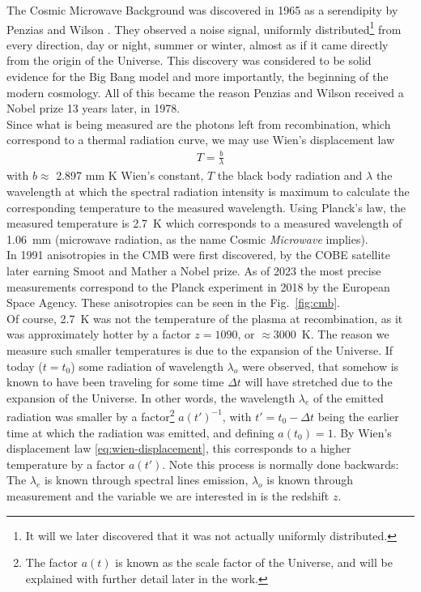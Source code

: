 The Cosmic Microwave Background was discovered in 1965 as a serendipity by Penzias and Wilson \cite{Penzias1965}. They observed a noise signal, uniformly distributed\footnote{It will we later discovered that it was not actually uniformly distributed.} from every direction, day or night, summer or winter, almost as if it came directly from the origin of the Universe.
This discovery was considered to be solid evidence for the Big Bang model and more importantly, the beginning of the modern cosmology. All of this became the reason Penzias and Wilson received a Nobel prize 13 years later, in 1978. \\

Since what is being measured are the photons left from recombination, which correspond to a thermal radiation curve, we may use Wien's displacement law
\begin{align}
	T = \frac{b}{\lambda}
	\label{eq:wien-displacement}
\end{align}
with $b\approx $ 2.897 mm K Wien's constant, $T$ the black body radiation and $\lambda$ the wavelength at which the spectral radiation intensity is maximum to calculate the corresponding temperature to the measured wavelength. Using Planck's law, the measured temperature is \SI{2.7}{K} which corresponds to a measured wavelength of \SI{1.06}{mm} (microwave radiation, as the name Cosmic \textit{Microwave} implies). \\

In 1991 anisotropies in the CMB were first discovered, by the COBE satellite \cite{SmootMather} later earning Smoot and Mather a Nobel prize. As of 2023 the most precise measurements correspond to the Planck experiment in 2018 \cite{Planck2018} by the European Space Agency. These anisotropies can be seen in the Fig.~\ref{fig:cmb}. \\

Of course, \SI{2.7}{K} was not the temperature of the plasma at recombination, as it was approximately hotter by a factor $z=1090$, or $\approx$\SI{3000}{K}. The reason we measure such smaller temperatures is due to the expansion of the Universe.
If today ($t=t_0$) some radiation of wavelength $\lambda_o$ were observed, that somehow is known to have been traveling for some time $\Delta t$ will have stretched due to the expansion of the Universe. In other words, the wavelength $\lambda_e$ of the emitted radiation was smaller by a factor\footnote{The factor $a(t)$ is known as the scale factor of the Universe, and will be explained with further detail later in the work.} $a(t')^{-1}$, with $t' = t_0-\Delta t$ being the earlier time at which the radiation was emitted, and defining $a(t_0)=1$. By Wien's displacement law \eqref{eq:wien-displacement}, this corresponds to a higher temperature by a factor $a(t')$. Note this process is normally done backwards: The $\lambda_e$ is known through spectral lines emission, $\lambda_o$ is known through measurement and the variable we are interested in is the redshift $z.$\\


